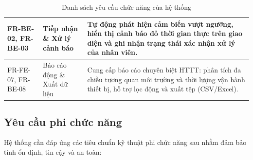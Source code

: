 \begin{table}[H]
\begin{tabularx}{\textwidth}{|l|p{3.8cm}|X|}
FR-BE-02, FR-BE-03 & Tiếp nhận \& Xử lý cảnh báo & Tự động phát hiện cảm biến vượt ngưỡng, hiển thị cảnh báo đỏ thời gian thực trên giao diện và ghi nhận trạng thái xác nhận xử lý của nhân viên. \\ \hline
FR-FE-07, FR-BE-08 & Báo cáo động \& Xuất dữ liệu & Cung cấp báo cáo chuyên biệt HTTT: phân tích đa chiều tương quan môi trường và thời lượng vận hành thiết bị, hỗ trợ lọc động và xuất tệp (CSV/Excel). \\ \hline
\end{tabularx}
\caption{Danh sách yêu cầu chức năng của hệ thống}
\label{tab:fr_list}
\end{table}

\subsection{Yêu cầu phi chức năng}

Hệ thống cần đáp ứng các tiêu chuẩn kỹ thuật phi chức năng sau nhằm đảm bảo tính ổn định, tin cậy và an toàn:

